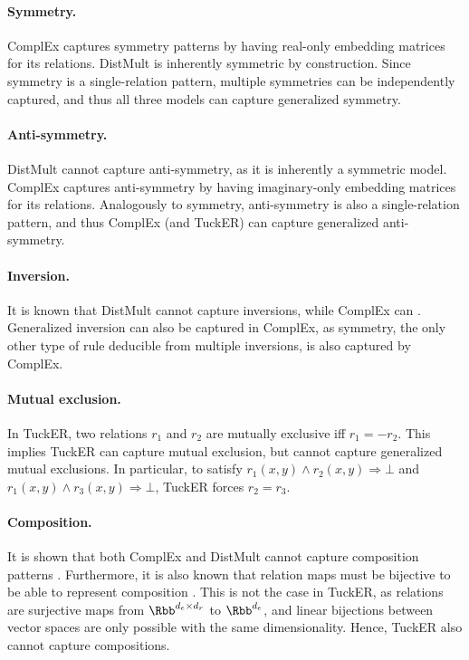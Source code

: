 \documentclass{article}
\begin{document}
\paragraph{Symmetry.} ComplEx captures symmetry patterns by having real-only embedding matrices for its relations. DistMult is inherently symmetric by construction. Since symmetry is a single-relation pattern, multiple symmetries can be independently captured, and thus all three models can capture generalized symmetry.

\paragraph{Anti-symmetry.} DistMult cannot capture anti-symmetry, as it is inherently a symmetric model. ComplEx captures anti-symmetry by having imaginary-only embedding matrices for its relations. Analogously to symmetry, anti-symmetry is also a single-relation pattern, and thus ComplEx (and TuckER) can capture generalized anti-symmetry.

\paragraph{Inversion.} It is known that DistMult cannot capture inversions, while ComplEx can \cite{RotatE-ICLR19}. Generalized inversion can also be captured in ComplEx, as symmetry, the only other type of rule deducible from multiple inversions, is also captured by ComplEx. 

\paragraph{Mutual exclusion.} In TuckER, two relations $r_1$ and $r_2$ are mutually exclusive iff $r_1 = -r_2$. This implies TuckER can capture mutual exclusion, but cannot capture generalized mutual exclusions. In particular, to satisfy $r_1(x,y) \land r_2(x,y) \Rightarrow \bot$ and $r_1(x,y) \land r_3(x,y) \Rightarrow \bot$, TuckER forces $r_2 = r_3$.

\paragraph{Composition.} It is shown that both ComplEx and DistMult cannot capture composition patterns \cite{RotatE-ICLR19, Gutirrez18}. Furthermore, it is also known that relation maps must be bijective to be able to represent composition \cite{RotatE-ICLR19}. 
This is not the case in TuckER, as relations are surjective maps from $\Rbb^{d_e \times d_r}$ to $\Rbb^{d_e}$, and linear bijections between vector spaces are only possible with the same dimensionality. Hence, TuckER also cannot capture compositions. 
\end{document}
